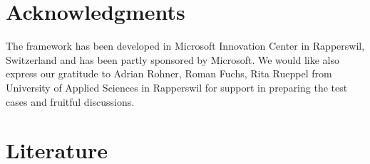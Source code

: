 \documentclass[3p,times]{elsarticle}
\begin{document}

\section{Acknowledgments}
\label{sec:ackn}

The framework has been developed in Microsoft Innovation Center in Rapperswil, Switzerland and has been partly sponsored by Microsoft. We would like also express our gratitude to Adrian Rohner, Roman Fuchs, Rita Rueppel from University of Applied Sciences in Rapperswil for support in preparing the test cases and fruitful discussions.

\section{Literature}
\label{sec:literature}



\end{document}
